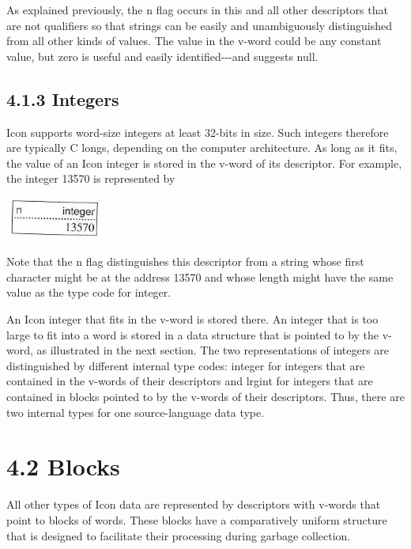 As explained previously, the n flag occurs in this and all other
descriptors that are not qualifiers so that strings can be easily and
unambiguously distinguished from all other kinds of values. The value
in the v-word could be any constant value, but zero is useful and
easily identified-{}-{}-and suggests
{\textquotedbl}null.{\textquotedbl}

\subsection[4.1.3 Integers]{4.1.3 Integers}

Icon supports word-size integers at least 32-bits in size. Such
integers therefore are typically C longs, depending on the computer
architecture. As long as it fits, the value of an Icon integer is
stored in the v-word of its descriptor.  For example, the integer
13570 is represented by

\begin{center}
\includegraphics[width=1.2799in,height=0.5492in]{ib-img/ib-img009.jpg}
\end{center}

Note that the n flag distinguishes this descriptor from a string whose
first character might be at the address 13570 and whose length might
have the same value as the type code for integer.

An Icon integer that fits in the v-word is stored there. An integer
that is too large to fit into a word is stored in a data structure
that is pointed to by the v-word, as illustrated in the next
section. The two representations of integers are distinguished by
different internal type codes: integer for integers that are contained
in the v-words of their descriptors and lrgint for integers that are
contained in blocks pointed to by the v-words of their descriptors.
Thus, there are two internal types for one source-language data type.


\section[4.2 Blocks]{4.2 Blocks}

All other types of Icon data are represented by descriptors with
v-words that point to blocks of words. These blocks have a
comparatively uniform structure that is designed to facilitate their
processing during garbage collection.

